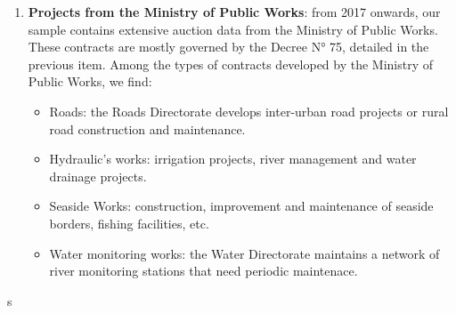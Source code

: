 \begin{enumerate}[wide, labelwidth=!,labelindent=0pt,label=\textbf{\arabic*}.]
\item \textbf{Projects from the Ministry of Public Works}: from 2017 onwards, our sample contains extensive auction data from the Ministry of Public Works. These contracts are mostly governed by the Decree N° 75, detailed in the previous item. Among the types of contracts developed by the Ministry of Public Works, we find:
\begin{itemize}[itemsep=1pt]
  \item Roads: the Roads Directorate develops inter-urban road projects or rural road construction and maintenance.
  \item Hydraulic's works: irrigation projects, river management and water drainage projects.
  \item Seaside Works: construction, improvement and maintenance of seaside borders, fishing facilities, etc.
  \item Water monitoring works: the Water Directorate maintains a network of river monitoring stations that need periodic maintenace.
\end{itemize}


\end{enumerate}s
